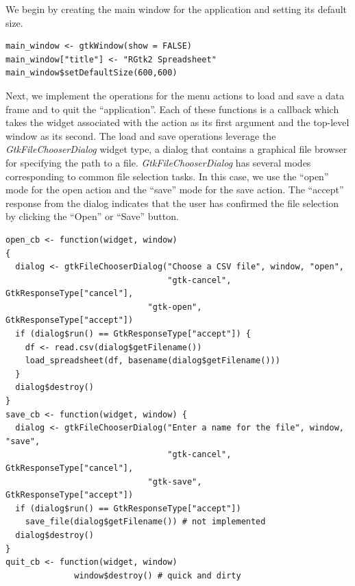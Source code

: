 \documentclass[article]{jss}
\begin{document}
We begin by creating the main window for the application and setting
its default size.
\begin{verbatim}
main_window <- gtkWindow(show = FALSE)
main_window["title"] <- "RGtk2 Spreadsheet"
main_window$setDefaultSize(600,600)
\end{verbatim}

Next, we implement the operations for the menu actions to load and
save a data frame and to quit the ``application''. Each of these
functions is a callback which takes the widget associated with the
action as its first argument and the top-level window as its
second. The load and save operations leverage the
\emph{GtkFileChooserDialog} widget type, a dialog that contains a
graphical file browser for specifying the path to a
file. \emph{GtkFileChooserDialog} has several modes corresponding to
common file selection tasks. In this case, we use the ``open'' mode
for the open action and the ``save'' mode for the save action. The
``accept'' response from the dialog indicates that the user has
confirmed the file selection by clicking the ``Open'' or ``Save''
button.
\begin{verbatim}
open_cb <- function(widget, window)  
{
  dialog <- gtkFileChooserDialog("Choose a CSV file", window, "open",
                                 "gtk-cancel",
GtkResponseType["cancel"],
	      	                 "gtk-open",
GtkResponseType["accept"])
  if (dialog$run() == GtkResponseType["accept"]) {
    df <- read.csv(dialog$getFilename())
    load_spreadsheet(df, basename(dialog$getFilename()))
  }
  dialog$destroy()
}
save_cb <- function(widget, window) {
  dialog <- gtkFileChooserDialog("Enter a name for the file", window,
"save",
                                 "gtk-cancel",
GtkResponseType["cancel"],
          	                 "gtk-save",
GtkResponseType["accept"])
  if (dialog$run() == GtkResponseType["accept"])
    save_file(dialog$getFilename()) # not implemented
  dialog$destroy()
}
quit_cb <- function(widget, window) 
              window$destroy() # quick and dirty

\end{verbatim}
\end{document}
